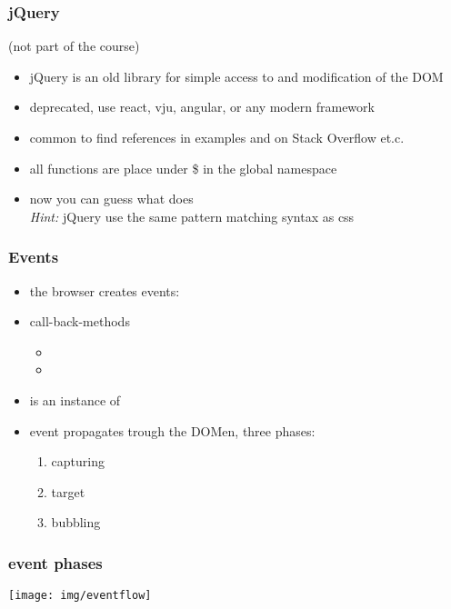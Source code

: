 \begin{frame}[fragile]
\frametitle{jQuery}
\color{structure}
(not part of the course)\\
\begin{itemize}\color{structure}
\item jQuery is an old library for simple access to and modification of the DOM
\item deprecated, use react, vju, angular, or any modern framework
\item common to find references in examples and on Stack Overflow et.c.
\item all functions are place under \$ in the global namespace
\item now you can guess what  does\\ \emph{Hint:} jQuery use the same pattern matching syntax as css
\end{itemize}
\end{frame}

\begin{frame}[fragile]
\frametitle{Events}
\color{structure}

\begin{itemize}\color{structure}
\item the browser creates events: 
\item call-back-methods
\begin{itemize}
  \item {}
  \item {}
\end{itemize}
\item {} is an instance of 
\item event propagates trough the DOMen, three phases:
  \begin{enumerate}
    \item capturing
    \item target
    \item bubbling
  \end{enumerate}
\end{itemize}

\end{frame}

\begin{frame}[fragile]
\frametitle{event phases}
\color{structure}
  \centering
  \texttt{[image: img/eventflow]}

\end{frame}

